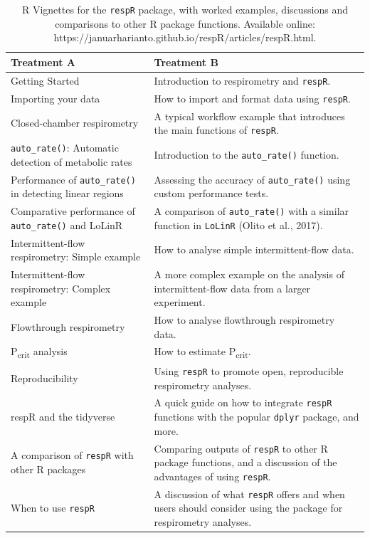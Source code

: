 \documentclass[a4paper,10pt, oneside]{memoir}
\begin{document}
\begin{table}[ht]
\centering
\caption[R Vignettes for the \texttt{respR} package, with worked examples, discussions and comparisons to other R package functions.]{R Vignettes for the \texttt{respR} package, with worked examples, discussions and comparisons to other R package functions. Available online: https://januarharianto.github.io/respR/articles/respR.html.}
\label{vignettelist}
\begin{tabular}[t]{>{\raggedright}p{0.4\linewidth}p{0.6\linewidth}}
\toprule
Treatment A&Treatment B\\
\midrule
Getting Started & Introduction to respirometry and \texttt{respR}. \\
Importing your data & How to import and format data using \texttt{respR}. \\
Closed-chamber respirometry & A typical workflow example that introduces the main functions of \texttt{respR}. \\
\texttt{auto\_rate()}: Automatic detection of metabolic rates & Introduction to the \texttt{auto\_rate()} function. \\
Performance of \texttt{auto\_rate()} in detecting linear regions & Assessing the accuracy of \texttt{auto\_rate()} using custom performance tests. \\
Comparative performance of \texttt{auto\_rate()} and LoLinR & A comparison of \texttt{auto\_rate()} with a similar function in \texttt{LoLinR} (Olito et al., 2017). \\
Intermittent-flow respirometry: Simple example & How to analyse simple intermittent-flow data. \\
Intermittent-flow respirometry: Complex example & A more complex example on the analysis of intermittent-flow data from a larger experiment. \\
Flowthrough respirometry & How to analyse flowthrough respirometry data. \\
P\textsubscript{crit} analysis & How to estimate P\textsubscript{crit}. \\
Reproducibility & Using \texttt{respR} to promote open, reproducible respirometry analyses. \\
respR and the tidyverse & A quick guide on how to integrate \texttt{respR} functions with the popular \texttt{dplyr} package, and more. \\
A comparison of \texttt{respR} with other R packages & Comparing outputs of \texttt{respR} to other R package functions, and a discussion of the advantages of using \texttt{respR}. \\
When to use \texttt{respR} & A discussion of what \texttt{respR} offers and when users should consider using the package for respirometry analyses. \\
\bottomrule
\end{tabular}
\end{table}
\end{document}
